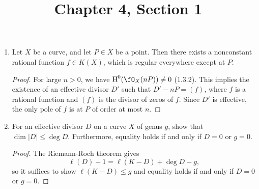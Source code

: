 \documentclass[a4paper]{article}
\title{Chapter 4, Section 1}
\begin{document}
\maketitle

\begin{enumerate} [label=\textbf{\arabic*.}, leftmargin=0em]

  \item Let $X$ be a curve, and let $P \in X$ be a point.
        Then there exists a nonconstant rational function $f \in K(X)$, which is regular everywhere except at $P$.

        \begin{proof}
          For large $n > 0$, we have $\cH^0(\fO_X(nP)) \neq 0$ (1.3.2).
          This implies the existence of an effective divisor $D'$ such that $D' - nP = (f)$, where $f$ is a rational function and $(f)$ is the divisor of zeros of $f$.
          Since $D'$ is effective, the only pole of $f$ is at $P$ of order at most $n$.
        \end{proof}





  \item[\textbf{5.}] For an effective divisor $D$ on a curve $X$ of genus $g$, show that $\dim{|D|} \leq \deg{D}$.
        Furthermore, equality holds if and only if $D = 0$ or $g = 0$.

        \begin{proof}
          The Riemann-Roch theorem gives
          \begin{equation*}
            \ell(D) - 1 = \ell(K - D) + \deg{D} - g,
          \end{equation*}
          so it suffices to show $\ell(K - D) \leq g$ and equality holds if and only if $D = 0$ or $g = 0$.


\end{proof}
\end{enumerate}
\end{document}
